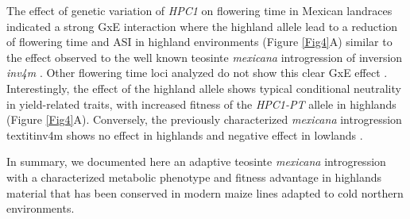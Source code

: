 \documentclass[9pt,twocolumn,twoside,lineno]{BioRxiv}
\begin{document}
The effect of genetic variation of \textit{HPC1} on flowering time in Mexican landraces indicated a strong GxE interaction where the highland allele lead to a reduction of flowering time and ASI in highland environments (Figure \ref{Fig4}A) similar to the effect observed to the well known teosinte \textit{mexicana} introgression of inversion \textit{inv4m} \cite{Crow2020-gene}.
Other flowering time loci analyzed do not show this clear GxE effect \cite{Gates2019-xu}.
Interestingly, the effect of the highland allele shows typical conditional neutrality in yield-related traits, with increased fitness of the \textit{HPC1-PT} allele in highlands (Figure \ref{Fig4}A).
Conversely, the previously characterized \textit{mexicana} introgression textit{inv4m} \cite{Gonzalez-Segovia2019-jy, pyhajarvi2013, Hufford2013-gs} shows no effect in highlands and negative effect in lowlands \cite{Crow2020-gene}.

In summary, we documented here an adaptive teosinte \textit{mexicana} introgression with a characterized metabolic phenotype and fitness advantage in highlands material that has been conserved in modern maize lines adapted to cold northern environments. 


\end{document}
